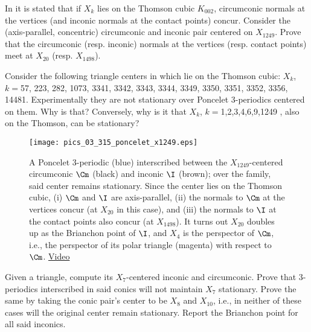 \begin{question}
In \cite{gibert2021-thomson} it is stated that if $X_k$ lies on the Thomson cubic $K_{002}$, circumconic normals at the vertices (and inconic normals at the contact points) concur. Consider the (axis-parallel, concentric) circumconic and inconic pair centered on $X_{1249}$. Prove that the circumconic (resp. inconic) normals at the vertices (resp. contact points) meet at $X_{20}$ (resp. $X_{1498}$).
\end{question}

\begin{question}
Consider the following triangle centers in \cite{gibert2021-thomson} which lie on the Thomson cubic: $X_k$, $k=$57, 223, 282, 1073, 3341, 3342, 3343, 3344, 3349, 3350, 3351, 3352, 3356, 14481. Experimentally they are not stationary over Poncelet 3-periodics centered on them. Why is that? Conversely, why is it that $X_k$, $k=$1,2,3,4,6,9,1249 , also on the Thomson, can be stationary?
\end{question}


\begin{figure}
    \centering
    \texttt{[image: pics\_03\_315\_poncelet\_x1249.eps]}
    \caption{A Poncelet 3-periodic (blue) interscribed between the $X_{1249}$-centered circumconic $\Cm$ (black) and inconic $\I$ (brown); over the family, said center remains stationary. Since the center lies on the Thomson cubic, (i) $\Cm$ and $\I$ are axis-parallel, (ii) the normals to $\Cm$ at the vertices concur (at $X_{20}$ in this case), and (iii) the normals to $\I$ at the contact points also concur (at $X_{1498}$). It turns out $X_{20}$ doubles up as the Brianchon point of $\I$, and $X_4$ is the perspector of $\Cm$, i.e., the perspector of its polar triangle (magenta) with respect to $\Cm$. \href{https://youtu.be/QQSN\_ndDJQk}{Video}}
    \label{fig:03-x1249}
\end{figure}

\begin{question}
Given a triangle, compute its $X_7$-centered inconic and circumconic. Prove that 3-periodics interscribed in said conics will not maintain $X_7$ stationary. Prove the same by taking the conic pair's center to be $X_8$ and $X_{10}$, i.e., in neither of these cases will the original center remain stationary. Report the Brianchon point for all said inconics.
\label{que:03-x7}
\end{question}

